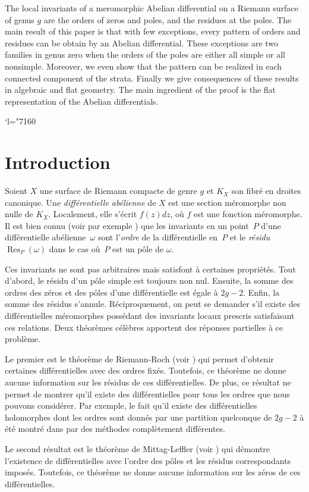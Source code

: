 \documentclass[JEP,XML,SOM,Unicode,francais,NoFloatCountersInSection,published]{cedram}
\newcommand{\Changel}{\mathcode`l="7160}
\newcommand\Res{\operatorname{Res}}
\theoremstyle{definition}
\begin{document}
\begin{altabstract}
The local invariants of a meromorphic Abelian differential on a Riemann surface of genus $g$ are the orders of zeros and poles, and the residues at the poles. The main result of this paper is that with few exceptions, every pattern of orders and residues can be obtain by an Abelian differential. These exceptions are two families in genus zero when the orders of the poles are either all simple or all nonsimple. Moreover, we even show that the pattern can be realized in each connected component of the strata. Finally we give consequences of these results in algebraic and flat geometry. The main ingredient of the proof is the flat representation of the Abelian differentials.
\end{altabstract}

\maketitle
\tableofcontents
\mainmatter
\Changel

\section{Introduction}

Soient $X$ une surface de Riemann compacte de genre $g$ et $K_{X}$ son fibré en droites canonique. Une \emph{différentielle abélienne} de $X$ est une section méromorphe non nulle de $K_{X}$. Localement, elle s'écrit $f(z)dz$, où $f$ est une fonction méromorphe.
Il est bien connu (voir par exemple \cite[Encadré\,III.2]{dSG}) que les invariants en un point~$P$ d'une différentielle abélienne~$\omega$ sont l'\emph{ordre} de la différentielle en~$P$ et le \emph{résidu $\Res_{P}(\omega)$} dans le cas où~$P$ est un pôle de $\omega$.

Ces invariants ne sont pas arbitraires mais satisfont à certaines propriétés. Tout d'abord, le résidu d'un pôle simple est toujours non nul. Ensuite, la somme des ordres des zéros et des pôles d'une différentielle est égale à $2g-2$. Enfin, la somme des résidus s'annule. Réciproquement, on peut se demander s'il existe des différentielles méromorphes possédant des invariants locaux prescris satisfaisant ces relations.
Deux théorèmes célèbres apportent des réponses partielles à ce problème.
\par
Le premier est le théorème de Riemann-Roch (voir \cite[Th.\,9.3]{reyssat}) qui permet d'obtenir certaines différentielles avec des ordres fixés. Toutefois, ce théorème ne donne aucune information sur les résidus de ces différentielles. De plus, ce résultat ne permet de montrer qu'il existe des différentielles pour tous les ordres que nous pouvons considérer. Par exemple, le fait qu'il existe des différentielles holomorphes dont les ordres sont donnés par une partition quelconque de $2g-2$ à été montré dans \cite{masm} par des méthodes complètement différentes.
\par
Le second résultat est le théorème de Mittag-Leffler (voir \cite[Prop.\,9.3]{reyssat}) qui démontre l'existence de différentielles avec l'ordre des pôles et les résidus correspondants imposés. Toutefois, ce théorème ne donne aucune information sur les zéros de ces différentielles.
\end{document}
